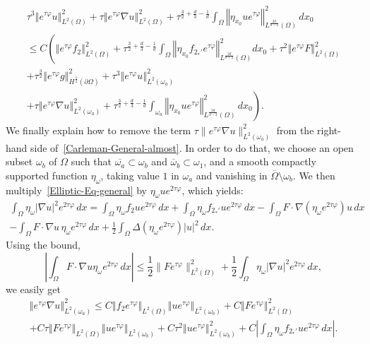 \documentclass[AHL,Unicode,longabstracts]{cedram}
\newcommand{\norm}[1]{\left\Vert#1\right\Vert}
\renewcommand{\leq}{\leqslant}
\begin{document}
\begin{multline}\label{Carleman-General-almost}
\tau^{3} \norm{e^{\tau \varphi} u}_{L^2(\Omega)}^2 +
\tau \norm{ e^{\tau \varphi} \nabla u }_{L^2(\Omega)}^2 +
\tau^{\frac{3}{2}+\frac{d}{3}-\frac{1}{d}} \int_{\Omega} \norm{\eta_{x_0} u e^{\tau \varphi}}_{L^{\frac{2d}{d-2}}(\Omega)}^2 \, dx_0
\\
\!\leq \! C \!\left(\!
\norm{ e^{\tau \varphi} f_2}_{L^2(\Omega)}^2\! +\!
\tau^{\frac{3}{2}+\frac{d}{3}-\frac{1}{d}}\!\!\! \int_{\Omega}\! \norm{ \eta_{x_0} f_{2_*'} e^{\tau \varphi}}_{L^{\frac{2d}{d+2}}(\Omega)}^2 \!\!dx_0\! + \!
\tau^2 \norm{e^{\tau \varphi} F}_{L^2(\Omega)}^2\! 
\right.
\\
\left. 
+ \!
\tau^{\frac{3}{2}} \norm{e^{\tau \varphi} g}_{H^{\frac{1}{2}}(\partial \Omega)}^2
+
\tau^{3} \norm{e^{\tau \varphi} u}_{L^2(\omega_a)}^2
\right.
\\
\left. 
+
\tau \norm{e^{\tau \varphi} \nabla u}_{L^2(\omega_a)}^2 +
\tau^{\frac{3}{2}+\frac{d}{3}-\frac{1}{d}} \int_{\omega_a} \norm{ \eta_{x_0} u e^{\tau \varphi} }_{L^{\frac{2d}{d-2}}(\Omega)}^2 \, dx_0
\right).
\end{multline}
We finally explain how to remove the term $\tau \| e^{\tau \varphi} \nabla u \|_{L^2(\omega_a)}^2$ from the right-hand side of~\eqref{Carleman-General-almost}. In order to do that, we choose an open subset $\omega_b$ of $\Omega$ such that $\overline{\omega_a} \subset \omega_b$ and $\overline\omega_b \subset \omega_1$, and a smooth compactly supported function $\eta_\omega$, taking value $1$ in $\omega_a$ and vanishing in $\overline\Omega\setminus \omega_b$. We then multiply~\eqref{Elliptic-Eq-general} by $\eta_\omega u e^{2 \tau \varphi}$, which yields:
\begin{multline*}
\int_\Omega \eta_\omega |\nabla u|^2 e^{2 \tau \varphi} \,dx =
\int_{\Omega} \eta_\omega f_2 u e^{2 \tau \varphi} \, dx +
\int_{\Omega} \eta_\omega f_{2_*'} u e^{2 \tau \varphi} \, dx -
\int_\Omega F \cdot \nabla \left(\eta_\omega e^{2 \tau \varphi}\right) u \, dx
\\
-
\int_\Omega F \cdot \nabla u \, \eta_\omega e^{2 \tau \varphi} \, dx +
\frac{1}{2} \int_\Omega \Delta \left(\eta_\omega e^{2 \tau \varphi}\right) |u|^2 \, dx.
\end{multline*}
Using the bound,
\[
\left |
\int_\Omega F \cdot \nabla u \eta_\omega e^{2 \tau \varphi}\, dx
\right|
\leq
\frac{1}{2} \| F e^{\tau \varphi} \|_{L^2(\Omega)}^2 +
\frac{1}{2} \int_\Omega \eta_\omega |\nabla u|^2 e^{2 \tau \varphi} \, dx,
\]
we easily get
\begin{multline*}
\norm{ e^{\tau \varphi} \nabla u}_{L^2(\omega_a)}^2
\leq C\norm{f_2 e^{\tau \varphi}}_{L^2(\Omega)}
\norm{u e^{\tau \varphi}}_{L^2(\omega_b)} + C \norm{ F e^{\tau \varphi} }_{L^2(\Omega)}^2
\\
+ C \tau\norm{ F e^{\tau \varphi}}_{L^2(\Omega)} \norm{u e^{\tau \varphi}}_{L^2(\omega_b)} + C
\tau^2\norm{u e^{\tau \varphi}}_{L^2(\omega_b)}^2 + C \left| \int_{\Omega} \eta_\omega f_{2_*'} u e^{2 \tau \varphi} \, dx\right|.
\end{multline*}
\end{document}
